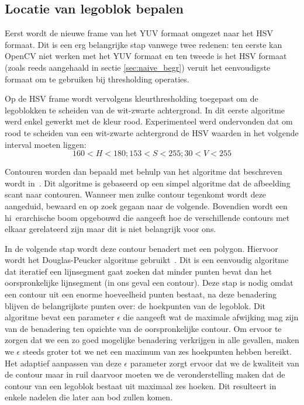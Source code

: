 \subsection{Locatie van legoblok bepalen} \label{sec:naive_algo_1}
Eerst wordt de nieuwe frame van het YUV formaat omgezet naar het HSV formaat. Dit is een erg belangrijke stap vanwege twee redenen: ten eerste kan OpenCV niet werken met het YUV formaat en ten tweede is het HSV formaat (zoals reeds aangehaald in sectie \ref{sec:naive_begr}) veruit het eenvoudigste formaat om te gebruiken bij thresholding operaties.

Op de HSV frame wordt vervolgens kleurthresholding toegepast om de legoblokken te scheiden van de wit-zwarte achtergrond. In dit eerste algoritme werd enkel gewerkt met de kleur rood. Experimenteel werd ondervonden dat om rood te scheiden van een wit-zwarte achtergrond de HSV waarden in het volgende interval moeten liggen:
$$ 160 < H < 180; 153 < S < 255; 30 < V < 255$$

Contouren worden dan bepaald met behulp van het algoritme dat beschreven wordt in~\cite{suzuki1985topological}. Dit algoritme is gebaseerd op een simpel algoritme dat de afbeelding scant naar contouren. Wanneer men zulke contour tegenkomt wordt deze aangeduid, bewaard en op zoek gegaan naar de volgende. Bovendien wordt een hi\ erarchische boom opgebouwd die aangeeft hoe de verschillende contours met elkaar gerelateerd zijn maar dit is niet belangrijk voor ons.

In de volgende stap wordt deze contour benadert met een polygon. Hiervoor wordt het Douglas-Peucker algoritme gebruikt~\cite{douglas1973algorithms}. Dit is een eenvoudig algoritme dat iteratief een lijnsegment gaat zoeken dat minder punten bevat dan het oorspronkelijke lijnsegment (in ons geval een contour). Deze stap is nodig omdat een contour uit een enorme hoeveelheid punten bestaat, na deze benadering blijven de belangrijkste punten over: de hoekpunten van de legoblok. Dit algoritme bevat een parameter $\epsilon$ die aangeeft wat de maximale afwijking mag zijn van de benadering ten opzichte van de oorspronkelijke contour. Om ervoor te zorgen dat we een zo goed mogelijke benadering verkrijgen in alle gevallen, maken we $\epsilon$ steeds groter tot we net een maximum van zes hoekpunten hebben bereikt. Het adaptief aanpassen van deze $\epsilon$ parameter zorgt ervoor dat we de kwaliteit van de contour maar in ruil daarvoor moeten we de veronderstelling maken dat de contour van een legoblok bestaat uit maximaal zes hoeken. Dit resulteert in enkele nadelen die later aan bod zullen komen.

